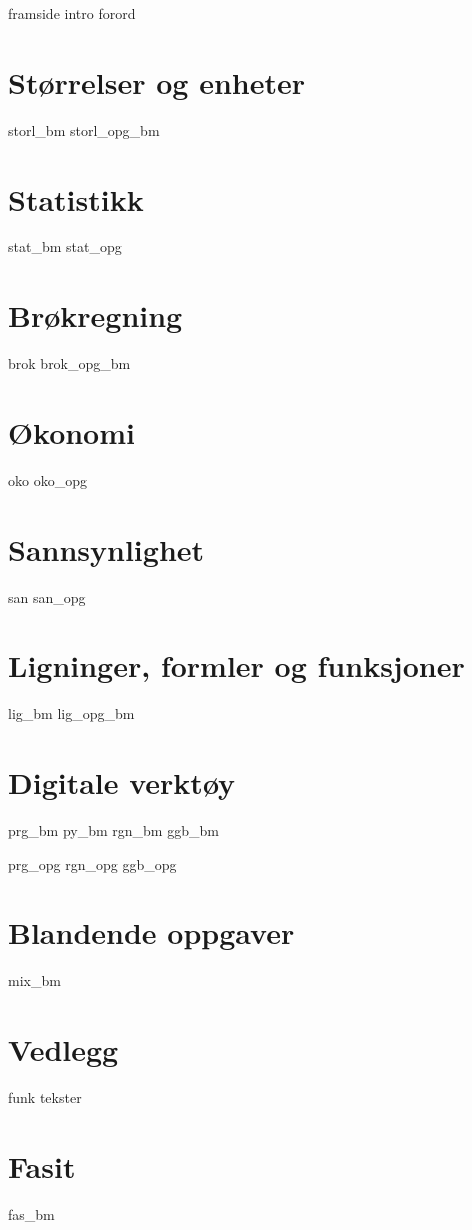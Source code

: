 




{framside}
{intro}
{forord}

\tableofcontents

\chapter{Størrelser og enheter \label{Storlogenh}}
\newpage
{storl_bm}
{storl_opg_bm}

\chapter{Statistikk \label{Statistikk}}
\newpage
{stat_bm}
{stat_opg}

\chapter{Brøkregning \label{BrokAM}}
\newpage
{brok}
\newpage
{brok_opg_bm}

\chapter{Økonomi \label{Okonomi}}
\newpage
{oko}
{oko_opg}

\chapter{Sannsynlighet \label{Sannsyn}} 
\newpage
{san}
{san_opg}

\chapter{Ligninger, formler og funksjoner \label{LigningerAM}}
\newpage
{lig_bm}
{lig_opg_bm}

\chapter{Digitale verktøy \label{Dig}}
{prg_bm}
{py_bm}
{rgn_bm}	
{ggb_bm}	

{prg_opg}
{rgn_opg}	
{ggb_opg}	

\chapter{Blandende oppgaver}
{mix_bm}

\chapter*{Vedlegg} 
\newpage
{}
{funk}
{tekster}

\chapter*{Fasit}
{fas_bm}







